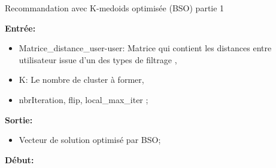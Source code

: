 \begin{algorithm}[H]
	\caption{Recommandation avec K-medoids optimisée (BSO) partie 1}
	\hspace*{\algorithmicindent} \textbf{Entrée:}
	\begin{itemize}
		\item [] Matrice{\_}distance{\_}user-user: Matrice qui contient les distances entre utilisateur issue d'un des types de filtrage , 
		\item [] K: Le nombre de cluster à former,
		\item [] nbrIteration, flip, local{\_}max{\_}iter ;
	\end{itemize}
	\hspace*{\algorithmicindent} \textbf{Sortie:} 
	\begin{itemize}
		\item [] Vecteur de solution optimisé par BSO;
	\end{itemize}
	\hspace*{\algorithmicindent}\textbf{ Début:}	
	

\end{algorithm}
